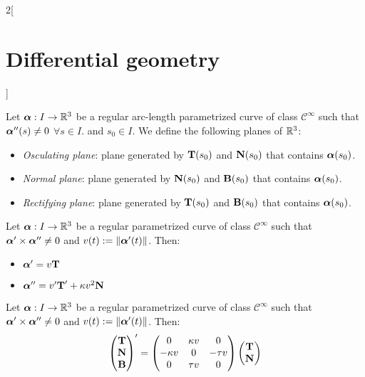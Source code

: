 \documentclass[../../../main.tex]{subfiles}
\begin{document}
\begin{multicols}{2}[\section{Differential geometry}]
  \begin{definition}
    Let $\vf{\alpha}:I\rightarrow\RR^3$ be a regular arc-length parametrized curve of class $\mathcal{C}^\infty$ such that $\vf{\alpha}''(s)\ne 0$ $\forall s\in I$. and $s_0\in I$. We define the following planes of $\RR^3$:
    \begin{itemize}
      \item \emph{Osculating plane}: plane generated by $\vf{T}(s_0)$ and $\vf{N}(s_0)$ that contains $\vf{\alpha}(s_0)$.
      \item \emph{Normal plane}: plane generated by $\vf{N}(s_0)$ and $\vf{B}(s_0)$ that contains $\vf{\alpha}(s_0)$.
      \item \emph{Rectifying plane}: plane generated by $\vf{T}(s_0)$ and $\vf{B}(s_0)$ that contains $\vf{\alpha}(s_0)$.
    \end{itemize}
  \end{definition}
  \begin{prop}
    Let $\vf{\alpha}:I\rightarrow\RR^3$ be a regular parametrized curve of class $\mathcal{C}^\infty$ such that $\vf{\alpha}'\times \vf{\alpha}''\ne 0$ and $v(t):=\|\vf{\alpha}'(t)\|$. Then:
    \begin{itemize}
      \item $\vf{\alpha}'=v\vf{T}$
      \item $\vf{\alpha}''=v'\vf{T}'+\kappa v^2\vf{N}$
    \end{itemize}
  \end{prop}
  \begin{theorem}
    Let $\vf{\alpha}:I\rightarrow\RR^3$ be a regular parametrized curve of class $\mathcal{C}^\infty$ such that $\vf{\alpha}'\times \vf{\alpha}''\ne 0$ and $v(t):=\|\vf{\alpha}'(t)\|$. Then:
    $$
      \begin{pmatrix}
        \vf{T} \\
        \vf{N} \\
        \vf{B} \\
      \end{pmatrix}'=
      \begin{pmatrix}
        0         & \kappa v & 0       \\
        -\kappa v & 0        & -\tau v \\
        0         & \tau v   & 0
      \end{pmatrix}
      \begin{pmatrix}
        \vf{T} \\
        \vf{N} \\

\end{pmatrix}$$
\end{theorem}
\end{multicols}
\end{document}
